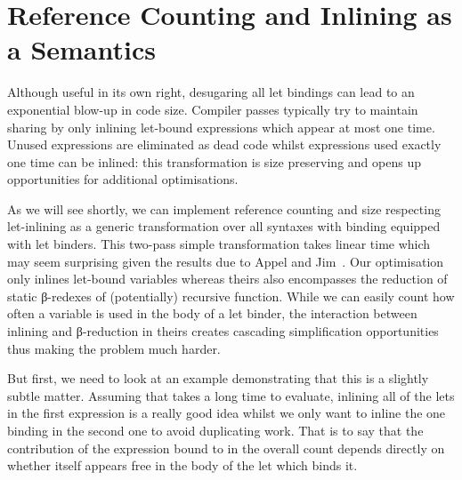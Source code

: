 \section{Reference Counting and Inlining as a Semantics}\label{section:inlining}

Although useful in its own right, desugaring all let bindings can lead
to an exponential blow-up in code size. Compiler passes typically try
to maintain sharing by only inlining let-bound expressions which appear
at most one time. Unused expressions are eliminated as dead code whilst
expressions used exactly one time can be inlined: this transformation is
size preserving and opens up opportunities for additional optimisations.

As we will see shortly, we can implement reference counting and size
respecting let-inlining as a generic transformation over all syntaxes
with binding equipped with let binders. This two-pass simple transformation
takes linear time which may seem surprising given the results due to Appel and
Jim~\citeyear{DBLP:journals/jfp/AppelJ97}. Our optimisation only inlines
let-bound variables whereas theirs also encompasses the reduction of static
β-redexes of (potentially) recursive function. While we can easily count how
often a variable is used in the body of a let binder, the interaction between
inlining and β-reduction in theirs creates cascading simplification opportunities
thus making the problem much harder.

But first, we need to look at an example demonstrating that this is a
slightly subtle matter. Assuming that  takes a long time
to evaluate, inlining all of the lets in the first expression is a really
good idea whilst we only want to inline the one binding  in the
second one to avoid duplicating work. That is to say that the contribution
of the expression bound to  in the overall count depends directly
on whether  itself appears free in the body of the let which binds it.

\begin{figure}[h]
\begin{minipage}{0.45\textwidth}
\end{minipage}
\begin{minipage}{0.45\textwidth}
\end{minipage}
\end{figure}

